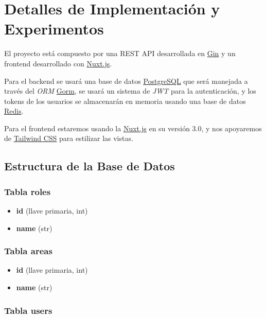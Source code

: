 \chapter{Detalles de Implementación y Experimentos}\label{chapter:implementation}

El proyecto está compuesto por una REST API desarrollada en \href{https://gin-gonic.com/}{Gin} y un frontend desarrollado con \href{https://nuxtjs.org/}{Nuxt.js}.
\newline

Para el backend se usará una base de datos \href{https://www.postgresql.org/}{PostgreSQL} que será manejada a través del \textit{ORM} \href{https://gorm.io/}{Gorm}, se usará un sistema de \textit{JWT} para la autenticación, y los tokens de los usuarios se almacenarán en memoria usando una base de datos \href{https://redis.io/}{Redis}.
\newline

Para el frontend estaremos usando la \href{https://nuxtjs.org/}{Nuxt.js} en su versión 3.0, y nos apoyaremos de \href{https://tailwindcss.com/}{Tailwind CSS} para estilizar las vistas.

\section{Estructura de la Base de Datos}
\subsection{Tabla roles}

\begin{itemize}
	\item \textbf{id} (llave primaria, int)
	\item \textbf{name} (str)
\end{itemize}

\subsection{Tabla areas}

\begin{itemize}
	\item \textbf{id} (llave primaria, int)
	\item \textbf{name} (str)
\end{itemize}

\subsection{Tabla users}

